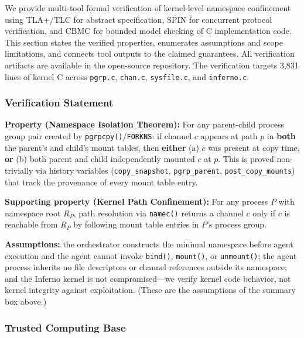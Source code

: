 \documentclass{article}
\begin{document}
We provide multi-tool formal verification of kernel-level namespace confinement using
TLA+/TLC for abstract specification, SPIN for concurrent protocol verification, and
CBMC for bounded model checking of C implementation code. This section states the
verified properties, enumerates assumptions and scope limitations, and connects tool
outputs to the claimed guarantees. All verification artifacts are available in the
open-source repository. The verification targets 3,831 lines of kernel C across
\texttt{pgrp.c}, \texttt{chan.c}, \texttt{sysfile.c}, and \texttt{inferno.c}.

\subsubsection{Verification Statement}

\textbf{Property (Namespace Isolation Theorem):} For any parent-child process group
pair created by \texttt{pgrpcpy()}/\texttt{FORKNS}: if channel $c$ appears at path $p$
in \textbf{both} the parent's and child's mount tables, then \textbf{either} (a) $c$
was present at copy time, \textbf{or} (b) both parent and child independently mounted
$c$ at $p$. This is proved non-trivially via history variables (\texttt{copy\_snapshot},
\texttt{pgrp\_parent}, \texttt{post\_copy\_mounts}) that track the provenance of every
mount table entry.

\textbf{Supporting property (Kernel Path Confinement):} For any process $P$ with
namespace root $R_P$, path resolution via \texttt{namec()} returns a channel $c$ only
if $c$ is reachable from $R_P$ by following mount table entries in $P$'s process group.

\textbf{Assumptions:} the orchestrator constructs the minimal namespace before agent execution and the agent cannot invoke \texttt{bind()}, \texttt{mount()}, or \texttt{unmount()}; the agent process inherits no file descriptors or channel references outside its namespace; and the Inferno kernel is not compromised---we verify kernel code behavior, not kernel integrity against exploitation. (These are the assumptions of the summary box above.)

\subsubsection{Trusted Computing Base}
\end{document}
